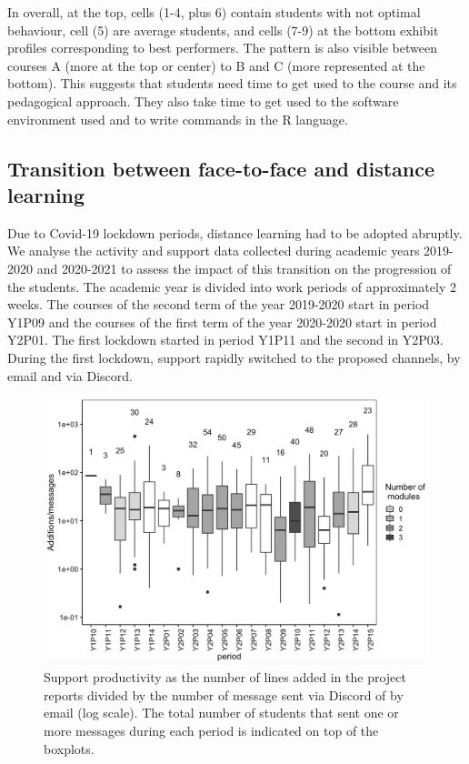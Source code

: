 \documentclass[
]{article}
\begin{document}
In overall, at the top, cells (1-4, plus 6) contain students with not
optimal behaviour, cell (5) are average students, and cells (7-9) at the
bottom exhibit profiles corresponding to best performers. The pattern is
also visible between courses A (more at the top or center) to B and C
(more represented at the bottom). This suggests that students need time
to get used to the course and its pedagogical approach. They also take
time to get used to the software environment used and to write commands
in the R language.

\hypertarget{transition-between-face-to-face-and-distance-learning}{%
\subsection{Transition between face-to-face and distance
learning}\label{transition-between-face-to-face-and-distance-learning}}

Due to Covid-19 lockdown periods, distance learning had to be adopted
abruptly. We analyse the activity and support data collected during
academic years 2019-2020 and 2020-2021 to assess the impact of this
transition on the progression of the students. The academic year is
divided into work periods of approximately 2 weeks. The courses of the
second term of the year 2019-2020 start in period Y1P09 and the courses
of the first term of the year 2020-2020 start in period Y2P01. The first
lockdown started in period Y1P11 and the second in Y2P03. During the
first lockdown, support rapidly switched to the proposed channels, by
email and via Discord.

\begin{figure}
\includegraphics[width=5.97in]{figures/add_per_message} \caption{Support productivity as the number of lines added in the project reports divided by the number of message sent via Discord of by email (log scale). The total number of students that sent one or more messages during each period is indicated on top of the boxplots.}\label{fig:timing}
\end{figure}
\end{document}
